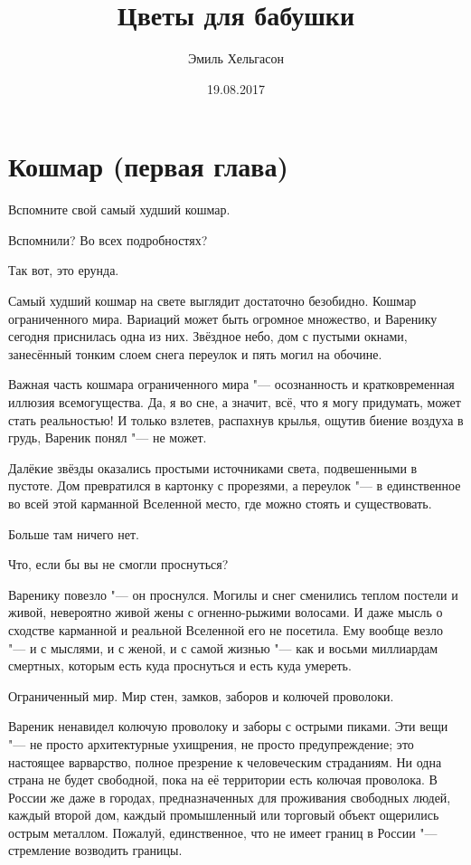 \author{Эмиль Хельгасон}
\title{Цветы для бабушки}
\date{19.08.2017}
\maketitle
\tableofcontents

\section{Кошмар (первая глава)}

Вспомните свой самый худший кошмар.

Вспомнили?
Во всех подробностях?

Так вот, это ерунда.

Самый худший кошмар на свете выглядит достаточно безобидно.
Кошмар ограниченного мира.
Вариаций может быть огромное множество, и Варенику сегодня приснилась одна из них.
Звёздное небо, дом с пустыми окнами, занесённый тонким слоем снега переулок и пять могил на обочине.

Важная часть кошмара ограниченного мира "--- осознанность и кратковременная иллюзия всемогущества.
Да, я во сне, а значит, всё, что я могу придумать, может стать реальностью!
И только взлетев, распахнув крылья, ощутив биение воздуха в грудь, Вареник понял "--- не может.

Далёкие звёзды оказались простыми источниками света, подвешенными в пустоте.
Дом превратился в картонку с прорезями, а переулок "--- в единственное во всей этой карманной Вселенной место, где можно стоять и существовать.

Больше там ничего нет.

Что, если бы вы не смогли проснуться?

Варенику повезло "--- он проснулся.
Могилы и снег сменились теплом постели и живой, невероятно живой жены с огненно-рыжими волосами.
И даже мысль о сходстве карманной и реальной Вселенной его не посетила.
Ему вообще везло "--- и с мыслями, и с женой, и с самой жизнью "--- как и восьми миллиардам смертных, которым есть куда проснуться и есть куда умереть.

\razd

Ограниченный мир.
Мир стен, замков, заборов и колючей проволоки.

Вареник ненавидел колючую проволоку и заборы с острыми пиками.
Эти вещи "--- не просто архитектурные ухищрения, не просто предупреждение;
это настоящее варварство, полное презрение к человеческим страданиям.
Ни одна страна не будет свободной, пока на её территории есть колючая проволока.
В России же даже в городах, предназначенных для проживания свободных людей, каждый второй дом, каждый промышленный или торговый объект ощерились острым металлом.
Пожалуй, единственное, что не имеет границ в России "--- стремление возводить границы.

